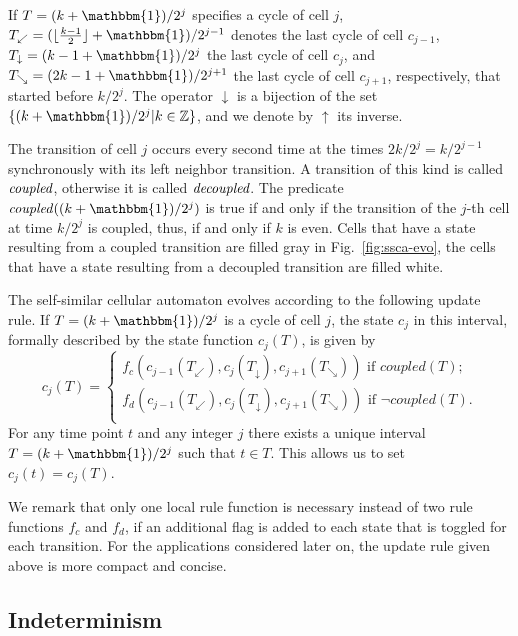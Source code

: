 \documentclass{article}
\theoremstyle{definition}
\begin{document}
If $T=(k + \mathbbm{1})/2^j$ specifies a cycle of cell $j$,
$T_\swarrow= (\lfloor \frac{k-1}{2} \rfloor + \mathbbm{1})/2^{j-1}$ denotes the last cycle of cell $c_{j-1}$,
$T_\downarrow= (k - 1 + \mathbbm{1})/2^j$ the last cycle of cell $c_j$, and
$T_\searrow =  (2k-1 + \mathbbm{1})/2^{j+1}$ the last cycle of cell $c_{j+1}$, respectively, that started before $k/2^j$.
The operator $\downarrow$ is a bijection of the set $\{(k + \mathbbm{1})/2^j| k \in \mathbb{Z} \}$, and we denote by $\uparrow$ its inverse.

The transition of cell $j$ occurs every second time at the times $2k / 2^{j} = k / 2^{j-1}$ synchronously with its left neighbor transition.
A transition of this kind is called $\emph{coupled}$, otherwise it is called $\emph{decoupled}$.
The predicate $\mathit{coupled}((k + \mathbbm{1})/2^j)$ is true if and only if the transition of the $j$-th cell at time $k / 2^{j}$ is coupled, thus,
if and only if $k$ is even.
Cells that have a state resulting from a coupled transition are filled gray in Fig.~\ref{fig:ssca-evo},
the cells that have a state resulting from a decoupled transition are filled white.

The self-similar cellular automaton evolves according to the following update rule.
If $T=(k + \mathbbm{1})/ 2^{j}$ is a cycle of cell $j$, the state  $c_j$ in this interval, formally described by the state function $c_j(T)$, is given by
\begin{equation}
c_j(T) = \left\{
\begin{array}{l}
f_{c}(
	c_{j - 1}(T_\swarrow),
	c_j(T_\downarrow),
	c_{j + 1}(T_\searrow)
)  \mbox{  if $\mathit{coupled}(T)$;} \\
f_{d}(
	c_{j - 1}(T_\swarrow),
	c_j(T_\downarrow),
	c_{j + 1}(T_\searrow)
) \mbox{  if $\neg\mathit{coupled}(T)$.} \\
\end{array}
\right.
\end{equation}
For any time point $t$ and any integer $j$ there exists a unique interval $T=(k + \mathbbm{1})/ 2^{j}$ such that $t \in T$.
This allows us to set $c_j(t) = c_j(T)$.

We remark that only one local rule function is necessary instead of two rule functions $f_c$ and $f_d$,
if an additional flag is added to each state that is toggled for each transition.
For the applications considered later on, the update rule given above is more compact and concise.

\subsection{Indeterminism}
\end{document}
